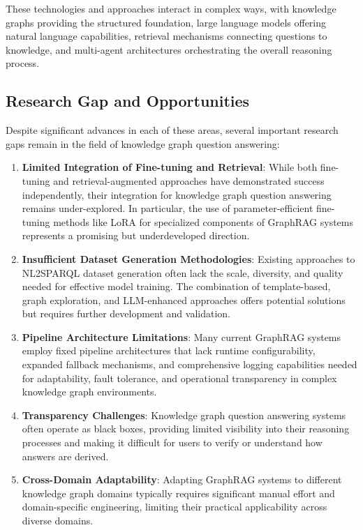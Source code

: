 These technologies and approaches interact in complex ways, with knowledge graphs providing the structured foundation, large language models offering natural language capabilities, retrieval mechanisms connecting questions to knowledge, and multi-agent architectures orchestrating the overall reasoning process.

\subsection{Research Gap and Opportunities}
Despite significant advances in each of these areas, several important research gaps remain in the field of knowledge graph question answering:

\begin{enumerate}
    \item \textbf{Limited Integration of Fine-tuning and Retrieval}: While both fine-tuning and retrieval-augmented approaches have demonstrated success independently, their integration for knowledge graph question answering remains under-explored. In particular, the use of parameter-efficient fine-tuning methods like LoRA for specialized components of GraphRAG systems represents a promising but underdeveloped direction.
    
    \item \textbf{Insufficient Dataset Generation Methodologies}: Existing approaches to NL2SPARQL dataset generation often lack the scale, diversity, and quality needed for effective model training. The combination of template-based, graph exploration, and LLM-enhanced approaches offers potential solutions but requires further development and validation.
    
    \item \textbf{Pipeline Architecture Limitations}: Many current GraphRAG systems employ fixed pipeline architectures that lack runtime configurability, expanded fallback mechanisms, and comprehensive logging capabilities needed for adaptability, fault tolerance, and operational transparency in complex knowledge graph environments.
    
    \item \textbf{Transparency Challenges}: Knowledge graph question answering systems often operate as black boxes, providing limited visibility into their reasoning processes and making it difficult for users to verify or understand how answers are derived.
    
    \item \textbf{Cross-Domain Adaptability}: Adapting GraphRAG systems to different knowledge graph domains typically requires significant manual effort and domain-specific engineering, limiting their practical applicability across diverse domains.
\end{enumerate}

